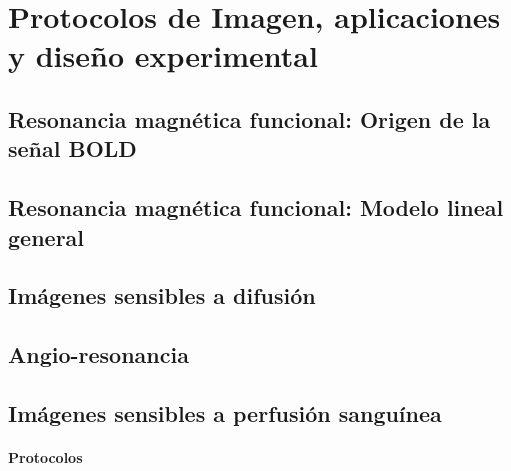 \documentclass[]{memoir}          %
\begin{document}
\part{Protocolos de Imagen, aplicaciones y diseño experimental}
\label{part_protocolos}


\chapter{Resonancia magnética funcional: Origen de la señal BOLD}
\label{chapter_bold}

\label{cap:origenBold}


\chapter{Resonancia magnética funcional: Modelo lineal general}



\chapter{Imágenes sensibles a difusión}
\label{chapter_difusion}


\chapter{Angio-resonancia}
\label{chapter_angio}




\chapter{Imágenes sensibles a perfusión sanguínea}
\label{chapter_perfusion}
\subsection{Protocolos}
\end{document}
